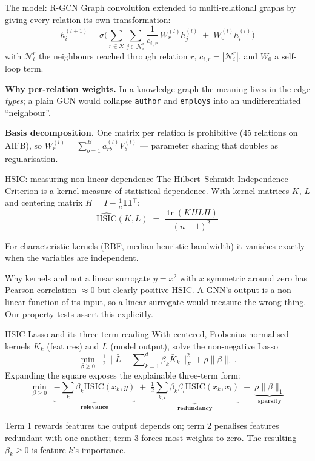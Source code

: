 \documentclass[10pt,aspectratio=169]{beamer}
\begin{document}
\begin{frame}{The model: R-GCN}
  Graph convolution extended to multi-relational graphs by giving every
  relation its own transformation:
  \[
    h_i^{(l+1)} = \sigma\!\Bigg( \sum_{r \in \mathcal{R}}
    \sum_{j \in \mathcal{N}_i^r} \frac{1}{c_{i,r}}\, W_r^{(l)} h_j^{(l)}
    \;+\; W_0^{(l)} h_i^{(l)} \Bigg)
  \]
  with $\mathcal{N}_i^r$ the neighbours reached through relation $r$,
  $c_{i,r}=|\mathcal{N}_i^r|$, and $W_0$ a self-loop term.

  \vfill
  \textbf{Why per-relation weights.} In a knowledge graph the meaning lives
  in the edge \emph{types}; a plain GCN would collapse \texttt{author} and
  \texttt{employs} into an undifferentiated ``neighbour''.

  \textbf{Basis decomposition.} One matrix per relation is prohibitive
  (45 relations on AIFB), so
  $W_r^{(l)} = \sum_{b=1}^{B} a_{rb}^{(l)} V_b^{(l)}$ --- parameter sharing
  that doubles as regularisation.
\end{frame}

\begin{frame}{HSIC: measuring non-linear dependence}
  The Hilbert--Schmidt Independence Criterion is a kernel measure of
  statistical dependence. With kernel matrices $K$, $L$ and centering matrix
  $H = I - \tfrac{1}{n}\mathbf{1}\mathbf{1}^{\!\top}$:
  \[
    \widehat{\mathrm{HSIC}}(K,L) \;=\; \frac{\operatorname{tr}(KHLH)}{(n-1)^2}
  \]

  For characteristic kernels (RBF, median-heuristic bandwidth) it vanishes
  exactly when the variables are independent.

  \vfill
  \begin{block}{Why kernels and not a linear surrogate}
    $y = x^2$ with $x$ symmetric around zero has Pearson correlation
    $\approx 0$ but clearly positive HSIC. A GNN's output is a non-linear
    function of its input, so a linear surrogate would measure the wrong
    thing. Our property tests assert this explicitly.
  \end{block}
\end{frame}

\begin{frame}{HSIC Lasso and its three-term reading}
  With centered, Frobenius-normalised kernels $\bar K_k$ (features) and
  $\bar L$ (model output), solve the non-negative Lasso
  \[
    \min_{\beta \ge 0} \;\; \tfrac{1}{2}
    \Big\| \bar L - \sum\nolimits_{k=1}^{d} \beta_k \bar K_k \Big\|_F^2
    + \rho \|\beta\|_1 .
  \]
  Expanding the square exposes the \alert{explainable three-term form}:
  \[
    \min_{\beta \ge 0} \;\;
    \underbrace{-\sum_k \beta_k \mathrm{HSIC}(x_k, y)}_{\textbf{relevance}}
    \;+\;
    \underbrace{\tfrac{1}{2}\sum_{k,l}\beta_k\beta_l \mathrm{HSIC}(x_k,x_l)}_{\textbf{redundancy}}
    \;+\;
    \underbrace{\rho\|\beta\|_1}_{\textbf{sparsity}}
  \]

  \vfill
  Term 1 rewards features the output depends on; term 2 penalises features
  redundant with one another; term 3 forces most weights to zero. The
  resulting $\beta_k \ge 0$ is feature $k$'s importance.
\end{frame}
\end{document}
